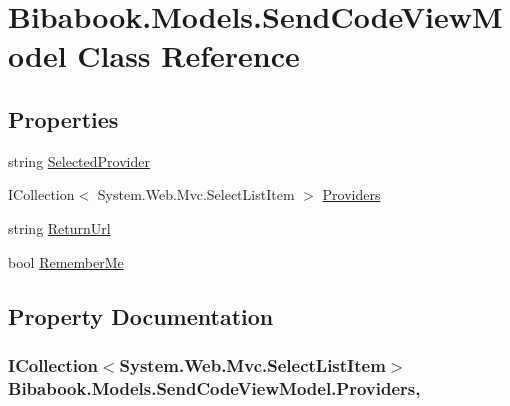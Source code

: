 \hypertarget{class_bibabook_1_1_models_1_1_send_code_view_model}{}\section{Bibabook.\+Models.\+Send\+Code\+View\+Model Class Reference}
\label{class_bibabook_1_1_models_1_1_send_code_view_model}
\subsection*{Properties}
\begin{DoxyCompactItemize}
\item 
string \hyperlink{class_bibabook_1_1_models_1_1_send_code_view_model_a7cd0f9f7fdf8c6c2d6629fa1b79c49ea}{Selected\+Provider}
\item 
I\+Collection$<$ System.\+Web.\+Mvc.\+Select\+List\+Item $>$ \hyperlink{class_bibabook_1_1_models_1_1_send_code_view_model_aaa85b6153acd866a2fb470ce5109f2d7}{Providers}
\item 
string \hyperlink{class_bibabook_1_1_models_1_1_send_code_view_model_ac32ec2ef86de91769c2dd847ffee0136}{Return\+Url}
\item 
bool \hyperlink{class_bibabook_1_1_models_1_1_send_code_view_model_a5a33496836395989dd4f39fb2fcbe03c}{Remember\+Me}
\end{DoxyCompactItemize}


\subsection{Property Documentation}
\hypertarget{class_bibabook_1_1_models_1_1_send_code_view_model_aaa85b6153acd866a2fb470ce5109f2d7}{}
\subsubsection[{Providers}]{\setlength{\rightskip}{0pt plus 5cm}I\+Collection$<$System.\+Web.\+Mvc.\+Select\+List\+Item$>$ Bibabook.\+Models.\+Send\+Code\+View\+Model.\+Providers\hspace{0.3cm}{\ttfamily [get]}, {\ttfamily [set]}}\label{class_bibabook_1_1_models_1_1_send_code_view_model_aaa85b6153acd866a2fb470ce5109f2d7}
\hypertarget{class_bibabook_1_1_models_1_1_send_code_view_model_a5a33496836395989dd4f39fb2fcbe03c}{}
